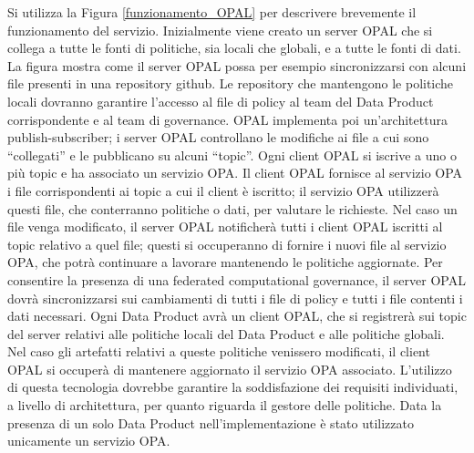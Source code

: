 \documentclass[12pt]{report}
\begin{document}
Si utilizza la Figura \ref{funzionamento_OPAL} per descrivere brevemente il funzionamento del servizio.
Inizialmente viene creato un server OPAL che si collega a tutte le fonti di politiche, sia locali che globali, e a tutte le fonti di dati.
La figura mostra come il server OPAL possa per esempio sincronizzarsi con alcuni file presenti in una repository github.
Le repository che mantengono le politiche locali dovranno garantire l'accesso al file di policy al team del Data Product corrispondente e al team di governance.
OPAL implementa poi un'architettura publish-subscriber;
i server OPAL controllano le modifiche ai file a cui sono ``collegati'' e le pubblicano su alcuni ``topic''.
Ogni client OPAL si iscrive a uno o più topic e ha associato un servizio OPA.
Il client OPAL fornisce al servizio OPA i file corrispondenti ai topic a cui il client è iscritto; il servizio OPA utilizzerà questi file, che conterranno politiche o dati, per valutare le richieste.
Nel caso un file venga modificato, il server OPAL notificherà tutti i client OPAL iscritti al topic relativo a quel file; questi si occuperanno di fornire i nuovi file al servizio OPA, che potrà continuare a lavorare mantenendo le politiche aggiornate.
Per consentire la presenza di una federated computational governance, il server OPAL dovrà sincronizzarsi sui cambiamenti di tutti i file di policy e tutti i file contenti i dati necessari.
Ogni Data Product avrà un client OPAL, che si registrerà sui topic del server relativi alle politiche locali del Data Product e alle politiche globali.
Nel caso gli artefatti relativi a queste politiche venissero modificati, il client OPAL si occuperà di mantenere aggiornato il servizio OPA associato.
L'utilizzo di questa tecnologia dovrebbe garantire la soddisfazione dei requisiti individuati, a livello di architettura, per quanto riguarda il gestore delle politiche.
Data la presenza di un solo Data Product nell'implementazione è stato utilizzato unicamente un servizio OPA.
\end{document}
